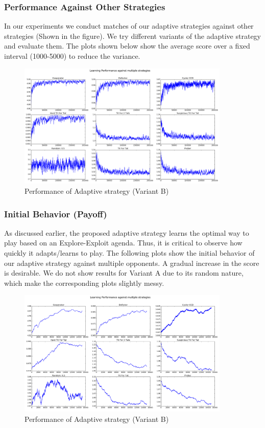 \documentclass[a4paper]{article}
\begin{document}
	\subsubsection{Performance Against Other Strategies}
	
	In our experiments we conduct matches of our adaptive strategies against other strategies (Shown in the figure). We try different variants of the adaptive strategy and evaluate them. The plots shown below show the average score over a fixed interval (1000-5000) to reduce the variance. 
	
	\begin{figure}[H]
	\centering
	\includegraphics[width=0.9\textwidth]{learnerB.png}
	\caption{{Performance of Adaptive strategy (Variant B)}}
	\end{figure}

	\subsubsection{Initial Behavior (Payoff)}

	As discussed earlier, the proposed adaptive strategy learns the optimal way to play based on an Explore-Exploit agenda. Thus, it is critical to observe how quickly it adapts/learns to play. The following plots show the initial behavior of our adaptive strategy against multiple opponents. A gradual increase in the score is desirable. We do not show results for Variant A due to its random nature, which make the corresponding plots slightly messy.\\

	\begin{figure}[H]
	\centering
	\includegraphics[width=0.9\textwidth]{learnerInitialB.png}
	\caption{{Performance of Adaptive strategy (Variant B)}}
	\end{figure}
\end{document}
